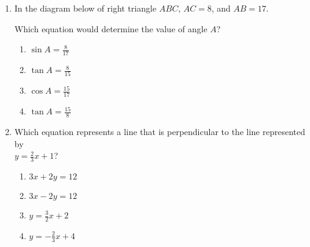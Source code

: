 \documentclass[12pt, oneside]{article}
\begin{document}
\begin{enumerate}[itemsep=0.5cm]
\item In the diagram below of right triangle $ABC$, $AC=8$, and $AB=17$.
  \begin{center}
  \end{center}
Which equation would determine the value of angle $A$?
  \begin{multicols}{2}
    \begin{enumerate}
      \item $\displaystyle \sin A = \frac{8}{17}$
      \item $\displaystyle \tan A = \frac{8}{15}$
      \item $\displaystyle \cos A = \frac{15}{17}$
      \item $\displaystyle \tan A = \frac{15}{8}$
    \end{enumerate}
  \end{multicols}

\item Which equation represents a line that is perpendicular to the line represented by\\[0.25cm] $\displaystyle y=\frac{2}{3}x+1$?
  \begin{multicols}{2}
    \begin{enumerate}
      \item $3x+2y=12$
      \item $3x-2y=12$ 
      \item $\displaystyle y=\frac{3}{2}x+2$
      \item $\displaystyle y=-\frac{2}{3}x+4$
    \end{enumerate}
  \end{multicols}


\end{enumerate}
\end{document}
